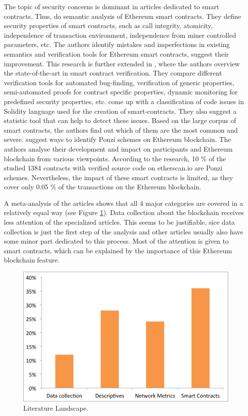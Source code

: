 The topic of security concerns is dominant in articles dedicated to smart contracts. 
Thus, \cite{grishchenko2018semantic} do semantic analysis of Ethereum smart contracts. 
They define security properties of smart contracts, such as call integrity, atomicity, independence of transaction environment, independence from miner controlled parameters, etc.
The authors identify mistakes and imperfections in existing semantics and verification tools for Ethereum smart contracts, suggest their improvement.
This research is further extended in \cite{grishchenko2018foundations}, where the authors overview the state-of-the-art in smart contract verification.
They compare different verification tools for automated bug-finding, verification of generic properties, semi-automated proofs for contract specific properties, dynamic monitoring for predefined security properties, etc.
\cite{tikhomirov2018smartcheck} come up with a classification of code issues in Solidity language used for the creation of smart-contracts. 
They also suggest a statistic tool that can help to detect these issues.
Based on the large corpus of smart contracts, the authors find out which of them are the most common and severe.
\cite{bartoletti2017dissecting} suggest ways to identify Ponzi schemes on Ethereum blockchain. 
The authors analyse their development and impact on participants and Ethereum blockchain from various viewpoints. 
According to the research, 10 \% of the studied 1384 contracts with verified source code
on etherscan.io are Ponzi schemes. 
Nevertheless, the impact of these smart contracts is limited, as they cover only 0.05 \% of the transactions on the Ethereum blockchain.


A meta-analysis of the articles shows that all 4 major categories are covered in a relatively equal way (see Figure \ref{fig:literature}).
Data collection about the blockchain receives less attention of the specialized articles.
This seems to be justifiable, sice data collection is just the first step of the analysis and other articles usually also have some minor part dedicated to this process.
Most of the attention is given to smart contracts, which can be explained by the importance of this Ethereum blockchain feature.

\begin{figure}[h]
  \centering
  \includegraphics[width=\linewidth]{figures/literature.png}
  \caption{Literature Landscape.}
  \label{fig:literature}
\end{figure}

